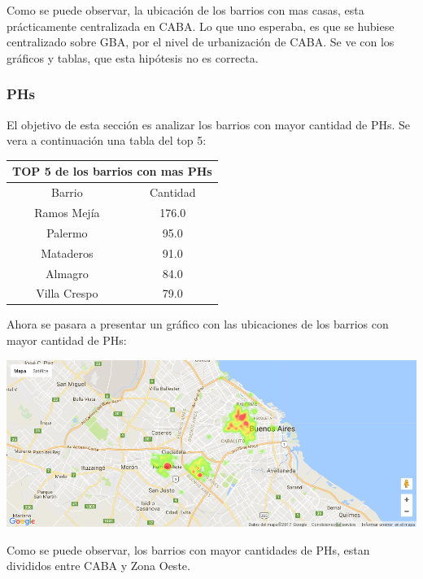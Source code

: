 \documentclass[a4paper, 10pt]{article}
\begin{document}
				Como se puede observar, la ubicación de los barrios con mas casas, esta prácticamente centralizada en CABA. Lo que uno esperaba, es que se hubiese centralizado sobre GBA, por el nivel de urbanización de CABA. Se ve con los gráficos y tablas, que esta hipótesis no es correcta.

				\subsubsection{PHs}

				El objetivo de esta sección es analizar los barrios con mayor cantidad de PHs. Se vera a continuación una tabla del top 5:

				\begin{center}
						\begin{tabular}{ |c|c| }
							\hline
							\multicolumn{2}{|c|}{TOP 5 de los barrios con mas PHs}\\
							\hline
							\hline
							Barrio & Cantidad\\
							\hline
							Ramos Mejía & 176.0 \\
							Palermo & 95.0 \\
							Mataderos &	91.0 \\
							Almagro & 84.0 \\
							Villa Crespo & 79.0 \\
							\hline
						\end{tabular}
					\end{center}

				Ahora se pasara a presentar un gráfico con las ubicaciones de los barrios con mayor cantidad de PHs:
				\begin{center}
   		    				\includegraphics[width=\textwidth]{images/ubicMPH}
				\end{center}

				Como se puede observar, los barrios con mayor cantidades de PHs, estan divididos entre CABA y Zona Oeste.
\end{document}
